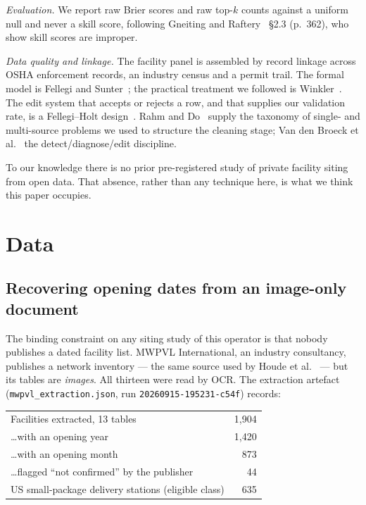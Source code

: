 \documentclass[conference]{IEEEtran}
\begin{document}
\emph{Evaluation.} We report raw Brier scores and raw top-$k$ counts against a
uniform null and never a skill score, following Gneiting and
Raftery~\cite{gneiting2007} \S2.3 (p.~362), who show skill scores are
improper.

\emph{Data quality and linkage.} The facility panel is assembled by record
linkage across OSHA enforcement records, an industry census and a permit
trail. The formal model is Fellegi and Sunter~\cite{fellegisunter1969}; the
practical treatment we followed is Winkler~\cite{winkler1999rl}. The edit
system that accepts or rejects a row, and that supplies our validation rate, is
a Fellegi--Holt design~\cite{fellegiholt1976,winkler1999edit}. Rahm and
Do~\cite{rahmdo2000} supply the taxonomy of single- and multi-source problems
we used to structure the cleaning stage; Van den Broeck et
al.~\cite{vandenbroeck2005} the detect/diagnose/edit discipline.

To our knowledge there is no prior pre-registered study of private facility
siting from open data. That absence, rather than any technique here, is what
we think this paper occupies.

\section{Data}

\subsection{Recovering opening dates from an image-only document}

The binding constraint on any siting study of this operator is that nobody
publishes a dated facility list. MWPVL International, an industry consultancy,
publishes a network inventory --- the same source used by
Houde et al.~\cite{houde2023} --- but its tables are \emph{images}. All
thirteen were read by OCR. The extraction artefact
(\texttt{mwpvl\_extraction.json}, run \texttt{20260915-195231-c54f}) records:

\begin{center}
\begin{tabular}{lr}
\hline
Facilities extracted, 13 tables & 1{,}904 \\
\ldots with an opening year & 1{,}420 \\
\ldots with an opening month & 873 \\
\ldots flagged ``not confirmed'' by the publisher & 44 \\
US small-package delivery stations (eligible class) & 635 \\
\hline
\end{tabular}
\end{center}
\end{document}

